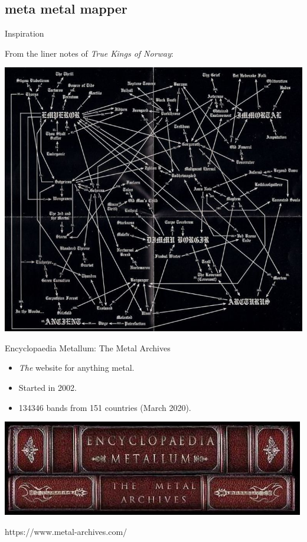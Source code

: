 \documentclass{beamer}
\begin{document}
  \subsection{meta metal mapper}

    \begin{frame}{Inspiration}
    
      From the liner notes of \textit{True Kings of Norway}:
    
      \begin{center}
        \includegraphics[scale=2.3]{true_kings_diagram}
      \end{center}
      
    \end{frame}
    
    \begin{frame}{Encyclopaedia Metallum: The Metal Archives}
    
      \begin{itemize}
        \item \textit{The} website for anything metal.
        \item Started in 2002.
        \item 134346 bands from 151 countries (March 2020).
      \end{itemize}
    
      \begin{center}
        \includegraphics[scale=.4]{MA_banner}
      \end{center}
      
      https://www.metal-archives.com/
      
    \end{frame}
\end{document}
